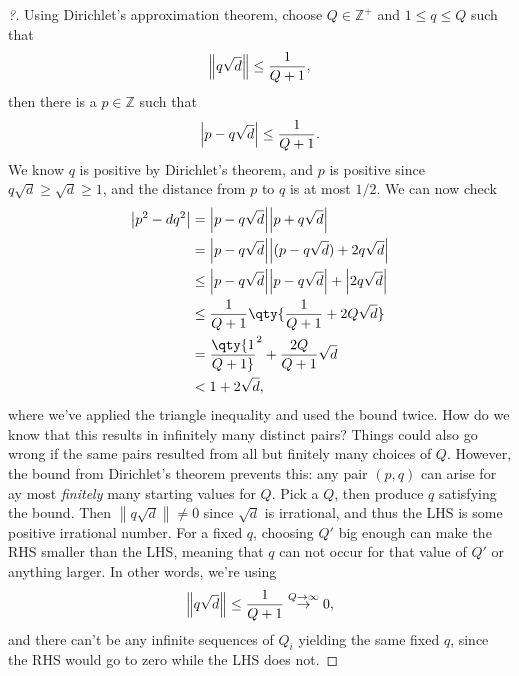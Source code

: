\begin{proof}[?]

Using Dirichlet's approximation theorem, choose \(Q \in {\mathbb{Z}}^+\)
and \(1\leq q\leq Q\) such that
\begin{align*}
{\left\lVert { q \sqrt{d} } \right\rVert} \leq {1 \over Q+1}
,\end{align*}
then there is a \(p \in {\mathbb{Z}}\) such that
\begin{align*}
{\left\lvert { p - q \sqrt{d} } \right\rvert} \leq {1 \over Q+1}
.\end{align*}
We know \(q\) is positive by Dirichlet's theorem, and \(p\) is positive
since \(q\sqrt{d} \geq \sqrt{d} \geq 1\), and the distance from \(p\) to
\(q\) is at most \(1/2\). We can now check
\begin{align*}
{\left\lvert {p^2 - dq^2} \right\rvert} 
&= {\left\lvert {p - q \sqrt{d}} \right\rvert} {\left\lvert {p + q \sqrt{d}} \right\rvert}    \\
&= {\left\lvert {p - q \sqrt{d}} \right\rvert} {\left\lvert {(p- q \sqrt{d} ) + 2q \sqrt{d} } \right\rvert}    \\
&\leq {\left\lvert {p - q \sqrt{d}} \right\rvert} {\left\lvert {p- q \sqrt{d}} \right\rvert} + {\left\lvert {2q \sqrt{d} } \right\rvert}    \\
&\leq {1\over Q+1} \qty{ {1\over Q+1} + 2Q \sqrt{d} }\\
&= \qty{1\over Q+1}^2 + {2Q \over Q+1} \sqrt{d} \\
&< 1 + 2\sqrt{d}
,\end{align*}
where we've applied the triangle inequality and used the bound twice.
How do we know that this results in infinitely many distinct pairs?
Things could also go wrong if the same pairs resulted from all but
finitely many choices of \(Q\). However, the bound from Dirichlet's
theorem prevents this: any pair \((p, q)\) can arise for ay most
\emph{finitely} many starting values for \(Q\). Pick a \(Q\), then
produce \(q\) satisfying the bound. Then
\({\left\lVert { q \sqrt{d} } \right\rVert} \neq 0\) since \(\sqrt{d}\)
is irrational, and thus the LHS is some positive irrational number. For
a fixed \(q\), choosing \(Q'\) big enough can make the RHS smaller than
the LHS, meaning that \(q\) can not occur for that value of \(Q'\) or
anything larger. In other words, we're using
\begin{align*}
{\left\lVert { q \sqrt{d} } \right\rVert} \leq {1\over Q+1} \overset{Q \to \infty } \to 0
,\end{align*}
and there can't be any infinite sequences of \(Q_i\) yielding the same
fixed \(q\), since the RHS would go to zero while the LHS does not.

\end{proof}

